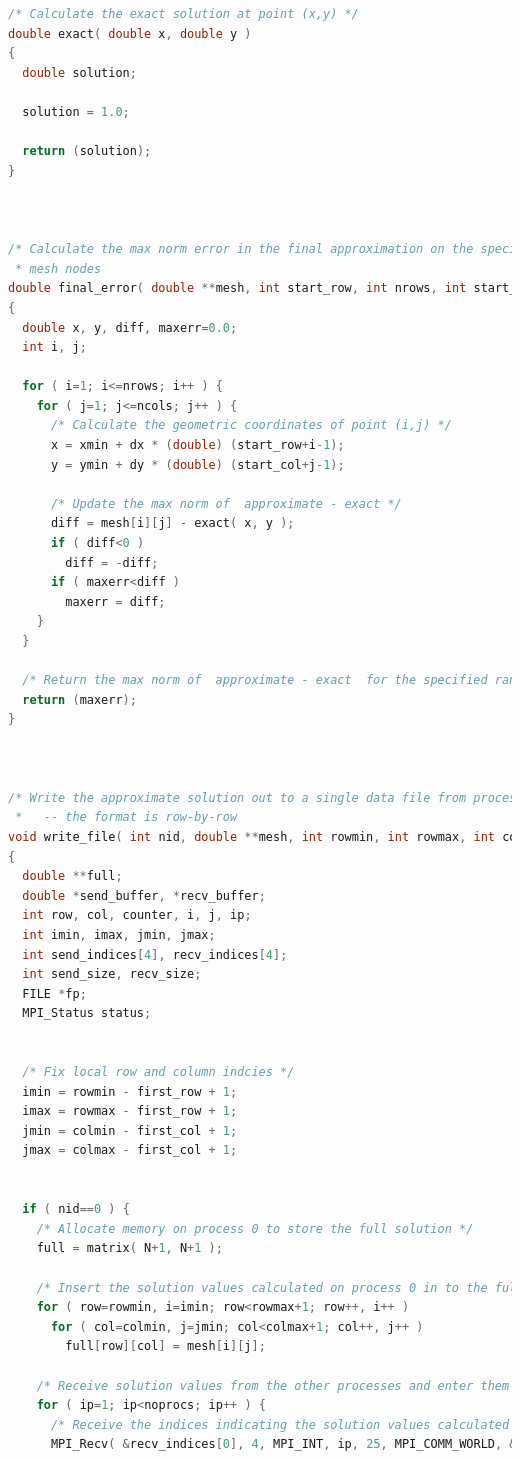 \documentclass{article}
\begin{document}
\begin{lstlisting}[language=C,frame=single]
/* Calculate the exact solution at point (x,y) */
double exact( double x, double y )
{
  double solution;

  solution = 1.0;

  return (solution);
}



/* Calculate the max norm error in the final approximation on the specified range of
 * mesh nodes                                                                        */
double final_error( double **mesh, int start_row, int nrows, int start_col, int ncols, double dx, double dy )
{
  double x, y, diff, maxerr=0.0;
  int i, j;

  for ( i=1; i<=nrows; i++ ) {
    for ( j=1; j<=ncols; j++ ) {
      /* Calculate the geometric coordinates of point (i,j) */
      x = xmin + dx * (double) (start_row+i-1);
      y = ymin + dy * (double) (start_col+j-1);

      /* Update the max norm of  approximate - exact */
      diff = mesh[i][j] - exact( x, y );
      if ( diff<0 )
        diff = -diff;
      if ( maxerr<diff )
        maxerr = diff;
    }
  }

  /* Return the max norm of  approximate - exact  for the specified range of nodes */
  return (maxerr);
}



/* Write the approximate solution out to a single data file from process 0
 *   -- the format is row-by-row                                           */
void write_file( int nid, double **mesh, int rowmin, int rowmax, int colmin, int colmax, int first_row, int first_col, int noprocs )
{
  double **full;
  double *send_buffer, *recv_buffer;
  int row, col, counter, i, j, ip;
  int imin, imax, jmin, jmax;
  int send_indices[4], recv_indices[4];
  int send_size, recv_size;
  FILE *fp;
  MPI_Status status;


  /* Fix local row and column indcies */
  imin = rowmin - first_row + 1;
  imax = rowmax - first_row + 1;
  jmin = colmin - first_col + 1;
  jmax = colmax - first_col + 1;


  if ( nid==0 ) {
    /* Allocate memory on process 0 to store the full solution */
    full = matrix( N+1, N+1 );

    /* Insert the solution values calculated on process 0 in to the full array */
    for ( row=rowmin, i=imin; row<rowmax+1; row++, i++ )
      for ( col=colmin, j=jmin; col<colmax+1; col++, j++ )
        full[row][col] = mesh[i][j];

    /* Receive solution values from the other processes and enter them in to the full array */
    for ( ip=1; ip<noprocs; ip++ ) {
      /* Receive the indices indicating the solution values calculated on process ip */
      MPI_Recv( &recv_indices[0], 4, MPI_INT, ip, 25, MPI_COMM_WORLD, &status );


\end{lstlisting}
\end{document}
